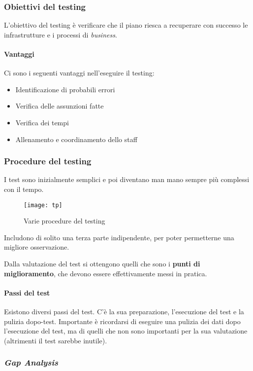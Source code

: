 \subsubsection{Obiettivi del testing}

L'obiettivo del testing è verificare che il piano riesca a recuperare con
successo le infrastrutture e i processi di \textit{business}.

\paragraph*{Vantaggi} Ci sono i seguenti vantaggi nell'eseguire il testing:
\begin{itemize}
  \item Identificazione di probabili errori
  \item Verifica delle assunzioni fatte
  \item Verifica dei tempi
  \item Allenamento e coordinamento dello staff
\end{itemize}

\subsubsection{Procedure del testing}

I test sono inizialmente semplici e poi diventano man mano sempre più complessi
con il tempo.

\begin{figure}[H]
 \centering
 \texttt{[image: tp]}
 \caption{Varie procedure del testing}
\end{figure}

Includono di solito una terza parte indipendente, per poter permetterne una
migliore osservazione.

Dalla valutazione del test si ottengono quelli che sono i \textbf{punti di
miglioramento}, che devono essere effettivamente messi in pratica.

\paragraph*{Passi del test} Esistono diversi passi del test. C'è la sua
preparazione, l'esecuzione del test e la pulizia dopo-test. Importante è
ricordarsi di eseguire una pulizia dei dati dopo l'esecuzione del test, ma di
quelli che non sono importanti per la sua valutazione (altrimenti il test
sarebbe inutile).

\subsubsection{\textit{Gap Analysis}}

